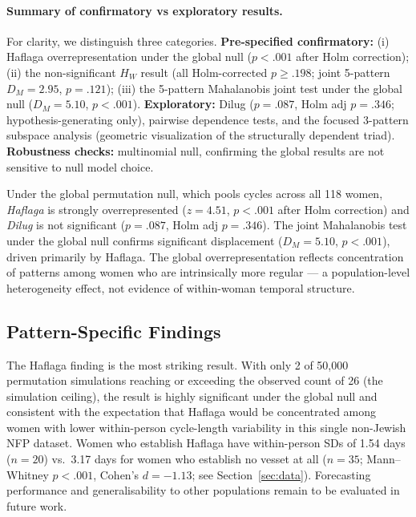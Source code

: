 \documentclass[12pt]{article}
\begin{document}
\paragraph{Summary of confirmatory vs exploratory results.}
For clarity, we distinguish three categories. \textbf{Pre-specified confirmatory:}
(i) Haflaga overrepresentation under the global null ($p < .001$ after Holm correction);
(ii) the non-significant $H_W$ result (all Holm-corrected $p \geq .198$; joint 5-pattern $D_M = 2.95$, $p = .121$);
(iii) the 5-pattern Mahalanobis joint test under the global null ($D_M = 5.10$, $p < .001$).
\textbf{Exploratory:} Dilug ($p = .087$, Holm adj $p = .346$; hypothesis-generating only), pairwise dependence tests, and the focused 3-pattern subspace analysis (geometric visualization of the structurally dependent triad).
\textbf{Robustness checks:} multinomial null, confirming the global results are not sensitive to null model choice.

Under the global permutation null, which pools cycles across all 118 women,
\textit{Haflaga} is strongly overrepresented ($z = 4.51$, $p < .001$ after
Holm correction) and \textit{Dilug} is not significant ($p = .087$, Holm adj $p = .346$). The joint Mahalanobis test under the global null confirms
significant displacement ($D_M = 5.10$, $p < .001$), driven primarily by Haflaga.
The global overrepresentation reflects concentration of patterns among women who are
intrinsically more regular --- a population-level heterogeneity effect, not evidence
of within-woman temporal structure.

\subsection{Pattern-Specific Findings}

The Haflaga finding is the most striking result. With only 2 of 50,000 permutation
simulations reaching or exceeding the observed count of 26 (the simulation ceiling),
the result is highly significant under the global null and consistent with the
expectation that Haflaga would be concentrated among women with lower within-person
cycle-length variability in this single non-Jewish NFP dataset. Women who establish
Haflaga have within-person SDs of 1.54 days ($n = 20$) vs.\ 3.17 days for women
who establish no vesset at all ($n = 35$; Mann--Whitney $p < .001$, Cohen's
$d = -1.13$; see Section~\ref{sec:data}). Forecasting performance and
generalisability to other populations remain to be evaluated in future work.
\end{document}
